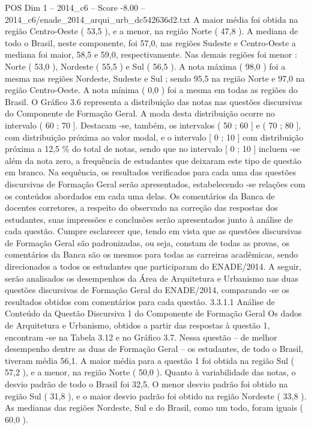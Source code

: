 \begin{textsample}{POS Dim 1 – 2014\_c6 – Score -8.00 – 2014\_c6/enade\_2014\_arqui\_urb\_dc542636d2.txt}
A maior média foi obtida na região Centro-Oeste ( 53,5 ), e a menor, na região Norte ( 47,8 ).
A mediana de todo o Brasil, neste componente, foi 57,0, nas regiões Sudeste e Centro-Oeste a mediana foi maior, 58,5 e 59,0, respectivamente.
Nas demais regiões foi menor : Norte ( 53,0 ), Nordeste ( 55,5 ) e Sul ( 56,5 ).
A nota máxima ( 98,0 ) foi a mesma nas regiões Nordeste, Sudeste e Sul ; sendo 95,5 na região Norte e 97,0 na região Centro-Oeste.
A nota mínima ( 0,0 ) foi a mesma em todas as regiões do Brasil.
O Gráfico 3.6 representa a distribuição das notas nas questões discursivas do Componente de Formação Geral.
A moda desta distribuição ocorre no intervalo ( 60 ; 70 ].
Destacam -se, também, os intervalos ( 50 ; 60 ] e ( 70 ; 80 ], com distribuição próxima ao valor modal, e o intervalo [ 0 ; 10 ] com distribuição próxima a 12,5 \% do total de notas, sendo que no intervalo [ 0 ; 10 ] incluem -se além da nota zero, a frequência de estudantes que deixaram este tipo de questão em branco.
Na sequência, os resultados verificados para cada uma das questões discursivas de Formação Geral serão apresentados, estabelecendo -se relações com os conteúdos abordados em cada uma delas.
Os comentários da Banca de docentes corretores, a respeito do observado na correção das respostas dos estudantes, suas impressões e conclusões serão apresentados junto à análise de cada questão.
Cumpre esclarecer que, tendo em vista que as questões discursivas de Formação Geral são padronizadas, ou seja, constam de todas as provas, os comentários da Banca são os mesmos para todas as carreiras acadêmicas, sendo direcionados a todos os estudantes que participaram do ENADE/2014.
A seguir, serão analisados os desempenhos da Área de Arquitetura e Urbanismo nas duas questões discursivas de Formação Geral do ENADE/2014, comparando -se os resultados obtidos com comentários para cada questão. 3.3.1.1 Análise de Conteúdo da Questão Discursiva 1 do Componente de Formação Geral Os dados de Arquitetura e Urbanismo, obtidos a partir das respostas à questão 1, encontram -se na Tabela 3.12 e no Gráfico 3.7.
Nessa questão – de melhor desempenho dentre as duas de Formação Geral – os estudantes, de todo o Brasil, tiveram média 56,1.
A maior média para a questão 1 foi obtida na região Sul ( 57,2 ), e a menor, na região Norte ( 50,0 ).
Quanto à variabilidade das notas, o desvio padrão de todo o Brasil foi 32,5.
O menor desvio padrão foi obtido na região Sul ( 31,8 ), e o maior desvio padrão foi obtido na região Nordeste ( 33,8 ).
As medianas das regiões Nordeste, Sul e do Brasil, como um todo, foram iguais ( 60,0 ).

\end{textsample}
